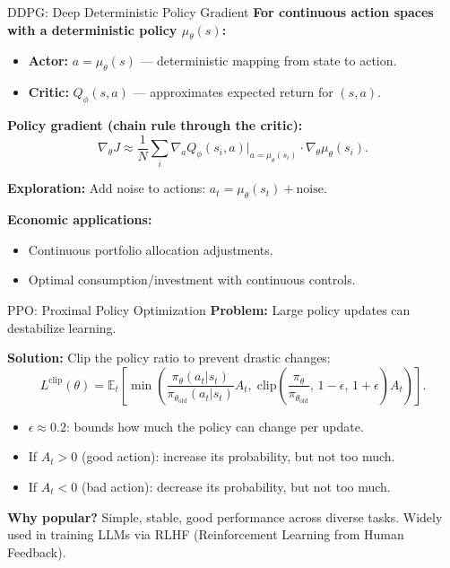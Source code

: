 \documentclass[10pt,english,aspectratio=169]{beamer}
\begin{document}
\begin{frame}{DDPG: Deep Deterministic Policy Gradient}
    \textbf{For continuous action spaces with a deterministic policy $\mu_\theta(s)$:}
    \begin{itemize}
        \item \textbf{Actor:} $a = \mu_\theta(s)$ --- deterministic mapping from state to action.
        \item \textbf{Critic:} $Q_\phi(s,a)$ --- approximates expected return for $(s,a)$.
    \end{itemize}

    \vspace{0.3cm}
    \textbf{Policy gradient (chain rule through the critic):}
    \[
      \nabla_\theta J \approx \frac{1}{N}\sum_i
      \nabla_a Q_\phi(s_i,a)\big|_{a=\mu_\theta(s_i)}
      \cdot \nabla_\theta \mu_\theta(s_i).
    \]

    \vspace{0.2cm}
    \textbf{Exploration:} Add noise to actions: $a_t = \mu_\theta(s_t) + \text{noise}$.

    \vspace{0.3cm}
    \textbf{Economic applications:}
    \begin{itemize}
        \item Continuous portfolio allocation adjustments.
        \item Optimal consumption/investment with continuous controls.
    \end{itemize}
\end{frame}


\begin{frame}{PPO: Proximal Policy Optimization}
    \textbf{Problem:} Large policy updates can destabilize learning.

    \vspace{0.2cm}
    \textbf{Solution:} Clip the policy ratio to prevent drastic changes:
    \[
      L^{\text{clip}}(\theta) = \mathbb{E}_t\!\left[
        \min\!\left(
          \frac{\pi_\theta(a_t|s_t)}{\pi_{\theta_{\text{old}}}(a_t|s_t)} A_t,\;
          \text{clip}\!\left(\frac{\pi_\theta}{\pi_{\theta_{\text{old}}}},\, 1{-}\epsilon,\, 1{+}\epsilon\right) A_t
        \right)
      \right].
    \]

    \begin{itemize}
        \item $\epsilon \approx 0.2$: bounds how much the policy can change per update.
        \item If $A_t > 0$ (good action): increase its probability, but not too much.
        \item If $A_t < 0$ (bad action): decrease its probability, but not too much.
    \end{itemize}

    \vspace{0.3cm}
    \textbf{Why popular?} Simple, stable, good performance across diverse tasks. Widely used in training LLMs via RLHF (Reinforcement Learning from Human Feedback).
\end{frame}
\end{document}
